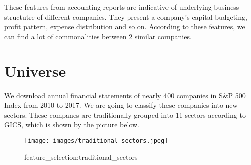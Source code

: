 \documentclass[../main.tex]{subfiles}
\begin{document}
These features from accounting reports are indicative of underlying business structutre of different companies. They present a company's capital budgeting, profit pattern, expense distribution and so on. According to these features, we can find a lot of commonalities between 2 similar companies.

\section{Universe}

We download annual financial statements of nearly 400 companies in S\&P 500 Index from 2010 to 2017. We are going to classify these companies into new sectors. These companes are traditionally grouped into 11 sectors according to GICS, which is shown by the picture below.

\begin{figure}[H]
    \texttt{[image: images/traditional\_sectors.jpeg]}
    \caption{feature_selection:traditional_sectors}
    \label{fig:feature_selection:traditional_sectors}
\end{figure}
\end{document}
